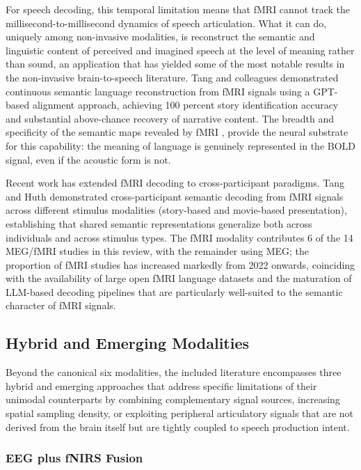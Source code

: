 For speech decoding, this temporal limitation means that fMRI cannot track the millisecond-to-millisecond dynamics of speech articulation. What it can do, uniquely among non-invasive modalities, is reconstruct the semantic and linguistic content of perceived and imagined speech at the level of meaning rather than sound, an application that has yielded some of the most notable results in the non-invasive brain-to-speech literature. Tang and colleagues \cite{Tang2023Semantic} demonstrated continuous semantic language reconstruction from fMRI signals using a GPT-based alignment approach, achieving 100 percent story identification accuracy and substantial above-chance recovery of narrative content. The breadth and specificity of the semantic maps revealed by fMRI \cite{Huth2016}, provide the neural substrate for this capability: the meaning of language is genuinely represented in the BOLD signal, even if the acoustic form is not.

Recent work has extended fMRI decoding to cross-participant paradigms. Tang and Huth \cite{Tang2025Semantic} demonstrated cross-participant semantic decoding from fMRI signals across different stimulus modalities (story-based and movie-based presentation), establishing that shared semantic representations generalize both across individuals and across stimulus types. The fMRI modality contributes 6 of the 14 MEG/fMRI studies in this review, with the remainder using MEG; the proportion of fMRI studies has increased markedly from 2022 onwards, coinciding with the availability of large open fMRI language datasets and the maturation of LLM-based decoding pipelines that are particularly well-suited to the semantic character of fMRI signals.

\subsection{Hybrid and Emerging Modalities}

Beyond the canonical six modalities, the included literature encompasses three hybrid and emerging approaches that address specific limitations of their unimodal counterparts by combining complementary signal sources, increasing spatial sampling density, or exploiting peripheral articulatory signals that are not derived from the brain itself but are tightly coupled to speech production intent.

\subsubsection{EEG plus fNIRS Fusion}

